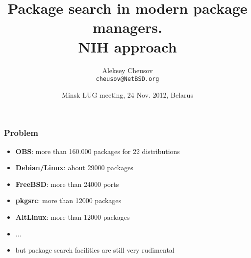 \documentclass[hyperref=unicode,ascii,xcolor=dvipsnames]{beamer}
\title{Package search in modern package managers.\\
NIH approach}
\author{Aleksey Cheusov\\
  \texttt{cheusov@NetBSD.org}}
\date{Minsk LUG meeting, 24 Nov. 2012, Belarus}
\begin{document}

\newenvironment{Code}[1]%
              {\Verbatim[label=\bf{#1},frame=single,%
                  fontsize=\small,%
                  commandchars=\\\{\}]}%
              {\endVerbatim}


\newenvironment{CodeNoLabel}%
               {\Verbatim[frame=single,%
                   fontsize=\small,%
                   commandchars=\\\{\}]}%
               {\endVerbatim}

\newenvironment{CodeNoLabelSmallest}%
               {\Verbatim[frame=single,%
                   fontsize=\footnotesize,%
                   commandchars=\\\{\}]}%
               {\endVerbatim}
\newenvironment{CodeLarge}%
               {\Verbatim[frame=single,%
                   fontsize=\large,%
                   commandchars=\\\{\}]}%
               {\endVerbatim}

\newcommand{\prompt}[1]{{\bf{#1}}}
\newcommand{\h}[1]{{\bf{#1}}}
\newcommand{\URL}[1]{\textbf{#1}}
\newcommand{\AutohellFile}[1]{\textcolor{red}{#1}}
\newcommand{\MKCfile}[1]{\textcolor{green}{#1}}
\newcommand{\ModuleName}[1]{\textbf{#1}\textnormal{}}
\newcommand{\ProgName}[1]{\textbf{#1}\textnormal{}}
\newcommand{\ProjectName}[1]{\textbf{#1}\textnormal{}}
\newcommand{\PackageName}[1]{\textbf{#1}\textnormal{}}
\newcommand{\MKC}[1]{\large\textsf{#1}\textnormal{}\normalsize}

\begin{frame}
  \titlepage
\end{frame}

\begin{frame}[fragile]
  \frametitle{Problem}
  \begin{itemize}
  \item {\bf OBS}: more than 160.000 packages for 22 distributions
  \item {\bf Debian/Linux}: about 29000 packages
  \item {\bf FreeBSD}: more than 24000 ports
  \item {\bf pkgsrc}: more than 12000 packages
  \item {\bf AltLinux}: more than 12000 packages
  \item ...
  \item but package search facilities are still very rudimental
  \end{itemize}
\end{frame}
\end{document}
